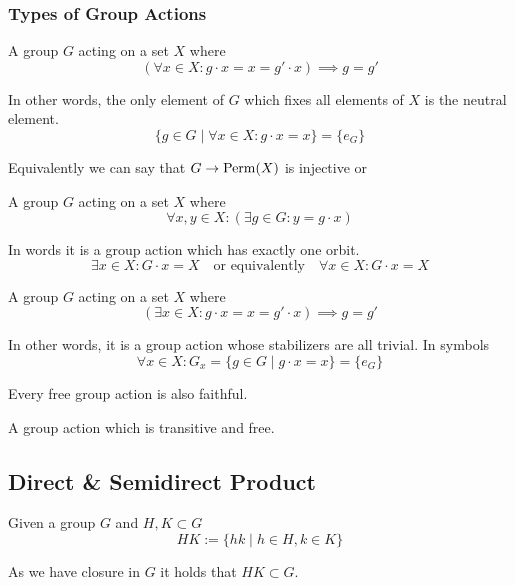 \subsubsection{Types of Group Actions}
\begin{definition}
   A group \(G\) acting on a set \(X\) where
   \[(\forall x \in X: g \cdot x = x = g' \cdot x) \implies g = g'\]
\end{definition}
\begin{remark}[Intuition]
   In other words, the only element of \(G\) which fixes all elements of \(X\) is the neutral element.
   \[\{g \in G \mid \forall x \in X: g \cdot x = x\} = \{e_G\}\]
\end{remark}
\begin{remark}
   Equivalently we can say that \(G \to \operatorname{Perm}(X)\) is injective or
\end{remark}

\begin{definition}
   A group \(G\) acting on a set \(X\) where
   \[\forall x, y \in X: (\exists g \in G: y = g \cdot x)\]
\end{definition}
\begin{remark}[Intuition]
   In words it is a group action which has exactly one orbit.
   \[\exists x \in X: G \cdot x = X \quad\text{or equivalently}\quad \forall x \in X: G \cdot x = X\]
\end{remark}

\begin{definition}
   A group \(G\) acting on a set \(X\) where
   \[(\exists x \in X: g \cdot x = x = g' \cdot x) \implies g = g'\]
\end{definition}
\begin{remark}[Intuition]
   In other words, it is a group action whose stabilizers are all trivial.
   In symbols
   \[\forall x \in X: G_x = \{g \in G \mid g\cdot x = x\} = \{e_G\}\]
\end{remark}
\begin{remark}
   Every free group action is also faithful.
\end{remark}

\begin{definition}
   A group action which is transitive and free.
\end{definition}

\subsection{Direct \& Semidirect Product}
\begin{definition}
   Given a group \(G\) and \(H, K \subset G\)
   \[HK := \{hk \mid h \in H, k \in K\}\]
\end{definition}
\begin{remark}
   As we have closure in \(G\) it holds that \(HK \subset G\).
\end{remark}

